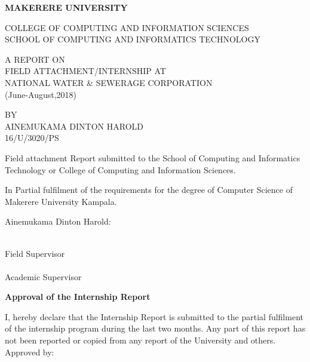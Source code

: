 \documentclass{article}
\begin{document}
\begin{titlepage}
\begin{center}
\textbf{MAKERERE UNIVERSITY}
\end{center}
COLLEGE OF COMPUTING AND INFORMATION SCIENCES\\
SCHOOL OF COMPUTING AND INFORMATICS TECHNOLOGY\\
\begin{center}
A REPORT ON\\FIELD ATTACHMENT/INTERNSHIP AT\\NATIONAL WATER \& SEWERAGE CORPORATION\\(June-August,2018)
\end{center}
\begin{center}
BY\\AINEMUKAMA DINTON HAROLD\\16/U/3020/PS
\end{center}
\hangindent 2cm Field attachment Report submitted to the School of Computing and Informatics Technology or College of Computing and Information Sciences.\\
\par In Partial fulfilment of the requirements for the degree of Computer Science of Makerere University Kampala.
\begin{center}
Ainemukama Dinton Harold:\dotfill
\end{center}
\makebox[2.5in]{\hrulefill} \hspace{0.3in}\makebox[2.5in]{\dotfill}\\
Field Supervisor \hspace{1.5in} \\
\vspace{.1in}
\makebox[2.5in]{\hrulefill} \hspace{0.3in}\makebox[2.5in]{\dotfill}\\
Academic Supervisor  \hspace{1.5in} \\
\end{titlepage}
\newpage
\textbf{Approval of the Internship Report}
\par I, hereby declare that the Internship Report is submitted to the partial fulfilment of the internship program during the last two months. Any part of this report has not been reported or copied from any report of the University and others.\\
Approved by:\\
\makebox[2.5in]{\hrulefill} \hspace{0.3in}\makebox[2.5in]{\dotfill}\\
\end{document}
